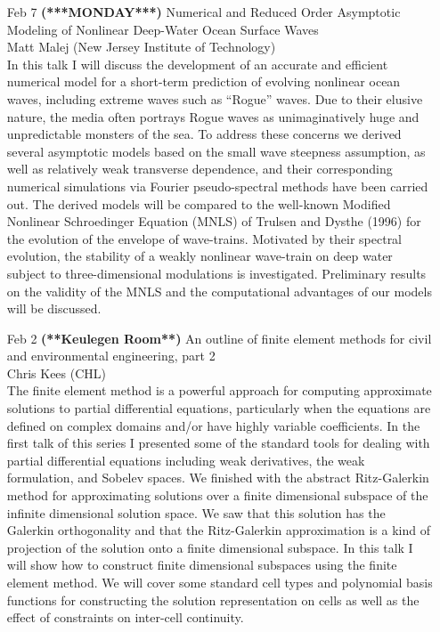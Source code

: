 \documentclass[12]{article}
\begin{document}
\begin{enumerate}
\item[Feb 7 {\bf (***MONDAY***)}]Numerical and Reduced Order Asymptotic Modeling of Nonlinear Deep-Water Ocean Surface Waves\\ Matt Malej (New Jersey Institute of Technology) \\ In this talk I will discuss the development of an accurate and efficient numerical model for a short-term prediction of evolving nonlinear ocean waves, including extreme waves such as ``Rogue'' waves. Due to their elusive nature, the media often portrays Rogue waves as unimaginatively huge and unpredictable monsters of the sea. To address these concerns we derived several asymptotic models based on the small wave steepness assumption, as well as relatively weak transverse dependence, and their corresponding numerical simulations via Fourier pseudo-spectral methods have been carried out. 
The derived models will be compared to the well-known Modified Nonlinear Schroedinger Equation (MNLS) of Trulsen and Dysthe (1996) for the evolution of the envelope of wave-trains. Motivated by their spectral evolution, the stability of a weakly nonlinear wave-train on deep water subject to three-dimensional modulations is investigated. Preliminary results on the validity of the MNLS and the computational advantages of our models will be discussed.

\item[Feb 2 {\bf (**Keulegen Room**)}]An outline of finite element methods for civil and environmental engineering, part 2\\Chris Kees (CHL)\\
The finite element method is a powerful approach for computing approximate solutions to partial differential equations, particularly when the equations are defined on complex domains and/or have highly variable coefficients. In the first talk of this series I presented some of the standard tools for dealing with partial differential equations including weak derivatives, the weak formulation, and Sobelev spaces. We finished with the abstract Ritz-Galerkin method for approximating solutions over a finite dimensional subspace of the infinite dimensional solution space. We saw that this solution has the Galerkin orthogonality and that the Ritz-Galerkin approximation is a kind of projection of the solution onto a finite dimensional subspace. In this talk I will show how to construct finite dimensional subspaces using the finite element method. We will cover some standard cell types and polynomial basis functions for constructing the solution representation on cells as well as the effect of constraints on inter-cell continuity.


\end{enumerate}
\end{document}
